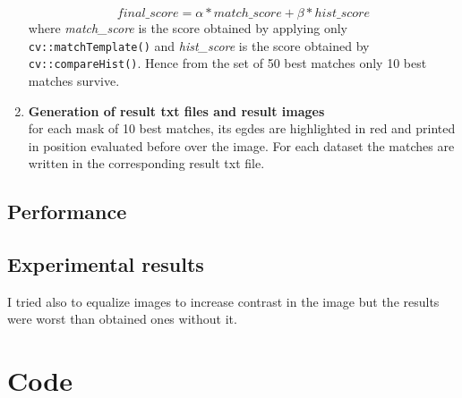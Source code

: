 \documentclass{article}
\begin{document}
\begin{enumerate}
{\begin{itemize}
{$$final\_score=\alpha*match\_score + \beta*hist\_score$$
where \textit{match\_score} is the score obtained by applying only \texttt{cv::matchTemplate()} and \textit{hist\_score} is the score obtained by \texttt{cv::compareHist()}. Hence from the set of 50 best matches only 10 best matches survive.}
\end{itemize}
}
\item{\textbf{Generation of result txt files and result images}\\
for each mask of 10 best matches, its egdes are highlighted in red and printed in position evaluated before over the image. For each dataset the matches are written in the corresponding result txt file.}
\end{enumerate}

\subsection{Performance}

\subsection{Experimental results}\label{exp}
I tried also to equalize images to increase contrast in the image but the results were worst than obtained ones without it.
\section{Code}
\end{document}
